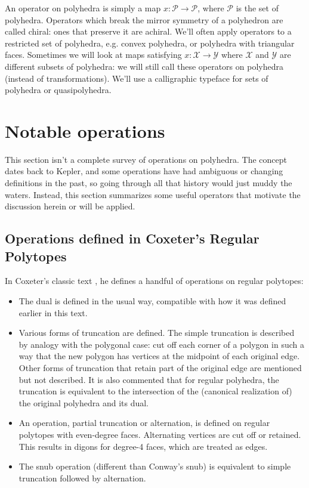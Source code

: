 \documentclass{article}
\begin{document}
An operator on polyhedra is simply a map $x : \mathcal{P} \to \mathcal{P}$,
where $\mathcal{P}$ is the set of polyhedra. Operators which break the mirror
symmetry of a polyhedron are called chiral: ones that preserve it are achiral.
We'll often apply operators to a restricted set of polyhedra, e.g. convex
polyhedra, or polyhedra with triangular faces. Sometimes we will look at maps
satisfying $x : \mathcal{X} \to \mathcal{Y}$ where $\mathcal{X}$ and
$\mathcal{Y}$ are different subsets of polyhedra: we will still call these
operators on polyhedra (instead of transformations). We'll use a calligraphic
typeface for sets of polyhedra or quasipolyhedra.

\section{Notable operations}

This section isn't a complete survey of operations on polyhedra. The concept
dates back to Kepler, and some operations have had ambiguous or changing
definitions in the past, so going through all that history would just muddy the
waters. Instead, this section summarizes some useful operators that motivate
the discussion herein or will be applied.

\subsection{Operations defined in Coxeter's Regular Polytopes}

In Coxeter's classic text \cite{Coxeter8},
he defines a handful of operations on regular polytopes:
\begin{itemize}
  \item The dual is defined in the usual way, compatible with how it was
  defined earlier in this text.
  \item Various forms of truncation are defined. The simple truncation is
  described by analogy with the polygonal case: cut off each corner of a
  polygon in such a way that the new polygon has vertices at the midpoint of
  each original edge. Other forms of truncation that retain part of the original
  edge are mentioned but not described. It is also commented that for regular
  polyhedra, the truncation is equivalent to the intersection
  of the (canonical realization of) the original polyhedra and its dual.
  \item An operation, partial truncation or alternation, is defined on regular
  polytopes with even-degree faces. Alternating vertices are cut off or
  retained. This results in digons for degree-4 faces,
  which are treated as edges.
  \item The snub operation (different than Conway's snub)
  is equivalent to simple truncation followed by alternation.
\end{itemize}
\end{document}
